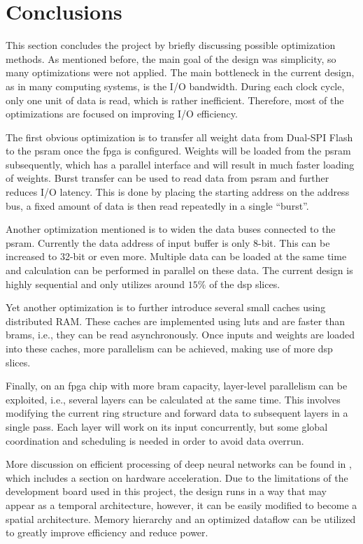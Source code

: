 
\chapter{Conclusions}

This section concludes the project by briefly discussing possible optimization methods.
As mentioned before, the main goal of the design was simplicity, so many optimizations were not applied.
The main bottleneck in the current design, as in many computing systems, is the I/O bandwidth. During
each clock cycle, only one unit of data is read, which is rather inefficient. Therefore, most of the
optimizations are focused on improving I/O efficiency.

The first obvious optimization is to transfer all weight data from Dual-SPI Flash to the \gls{psram} once
the \gls{fpga} is configured. Weights will be loaded from the \gls{psram} subsequently, which has a parallel
interface and will result in much faster loading of weights.
Burst transfer can be used to read data from \gls{psram} and further reduces I/O latency. This is done by
placing the starting address on the address bus, a fixed amount of data is then read repeatedly in a single
``burst''.

Another optimization mentioned is to widen the data buses connected to the \gls{psram}. Currently the
data address of input buffer is only 8-bit. This can be increased to 32-bit or even more. Multiple data
can be loaded at the same time and calculation can be performed in parallel on these data. The current
design is highly sequential and only utilizes around $15\%$ of the \gls{dsp} slices.

Yet another optimization is to further introduce several small caches using distributed RAM. These caches
are implemented using \glspl{lut} and are faster than \glspl{bram}, i.e., they can be read asynchronously.
Once inputs and weights are loaded into these caches, more parallelism can be achieved,
making use of more \gls{dsp} slices.

Finally, on an \gls{fpga} chip with more \gls{bram} capacity, layer-level parallelism can be exploited, i.e.,
several layers can be calculated at the same time. This involves modifying the current ring structure and
forward data to subsequent layers in a single pass. Each layer will work on its input concurrently, but
some global coordination and scheduling is needed in order to avoid data overrun.

More discussion on efficient processing of deep neural networks can be found in
\cite{DBLP:journals/corr/SzeCYE17}, which includes a section on hardware acceleration.
Due to the limitations of the development board used in this project, the design runs in a way that may
appear as a temporal architecture, however, it can be easily modified to become a spatial architecture.
Memory hierarchy and an optimized dataflow can be utilized to greatly improve efficiency and reduce
power.

\clearpage %
